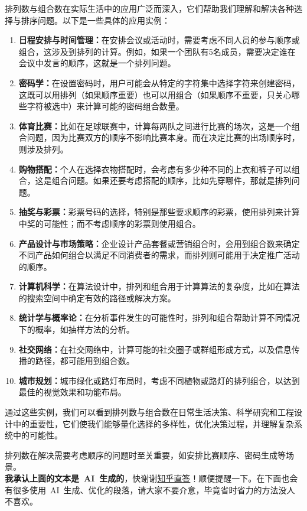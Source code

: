\documentclass[a5paper]{article}
\begin{document}
排列数与组合数在实际生活中的应用广泛而深入，它们帮助我们理解和解决各种选择与排序问题。以下是一些具体的应用实例：
\begin{enumerate}
    \item \textbf{日程安排与时间管理：}在安排会议或活动时，需要考虑不同人员的参与顺序或组合，这涉及到排列的计算。例如，如果一个团队有5名成员，需要决定谁在会议中发言的顺序，这就是一个排列问题。
    \item \textbf{密码学：}在设置密码时，用户可能会从特定的字符集中选择字符来创建密码，这既可以用排列（如果顺序重要）也可以用组合（如果顺序不重要，只关心哪些字符被选中）来计算可能的密码组合数量。
    \item \textbf{体育比赛：}比如在足球联赛中，计算每两队之间进行比赛的场次，这是一个组合问题，因为比赛双方的顺序不影响比赛本身。而在决定比赛的出场顺序时，则涉及排列。
    \item \textbf{购物搭配：}个人在选择衣物搭配时，会考虑有多少种不同的上衣和裤子可以组合，这是组合问题。如果还要考虑搭配的顺序，比如先穿哪件，那就是排列问题。
    \item \textbf{抽奖与彩票：}彩票号码的选择，特别是那些要求顺序的彩票，使用排列来计算中奖的可能性；而不考虑顺序的彩票则使用组合。
    \item\textbf{ 产品设计与市场策略：}企业设计产品套餐或营销组合时，会用到组合数来确定不同产品如何组合以满足不同消费者的需求，而排列则可能用于决定推广活动的顺序。
    \item \textbf{计算机科学：}在算法设计中，排列和组合用于计算算法的复杂度，比如在算法的搜索空间中确定有效的路径或解决方案。
    \item \textbf{统计学与概率论：}在分析事件发生的可能性时，排列和组合帮助计算不同情况下的概率，如抽样方法的分析。
    \item \textbf{社交网络：}在社交网络中，计算可能的社交圈子或群组形成方式，以及信息传播的路径，都可能用到组合数。
    \item \textbf{城市规划：}城市绿化或路灯布局时，考虑不同植物或路灯的排列组合，以达到最佳的视觉效果和功能布局。
\end{enumerate}
通过这些实例，我们可以看到排列数与组合数在日常生活决策、科学研究和工程设计中的重要性，它们使我们能够量化选择的多样性，优化决策过程，并理解复杂系统中的可能性。

排列数在解决需要考虑顺序的问题时至关重要，如安排比赛顺序、密码生成等场景。\\

\textbf{我承认上面的文本是~AI~生成的}，快谢谢\href{https://zhida.zhihu.com/}{知乎直答}！顺便提醒一下。在下面也会有很多使用~AI~生成、优化的段落，请大家不要介意，毕竟省时省力的方法没人不喜欢。
\end{document}
